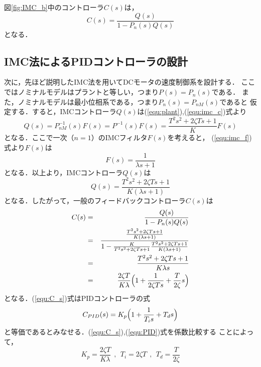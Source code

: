 \documentclass[a4paper,12pt]{jarticle}
\begin{document}
%
図\ref{fig:IMC_b}中のコントローラ$C(s)$は，
%
\begin{equation}
 C(s) = \frac{Q(s)}{1 - P_n(s)Q(s)}
\end{equation}
%
となる．
\subsection{IMC法によるPIDコントローラの設計}
次に，先ほど説明したIMC法を用いてDCモータの速度制御系を設計する．
ここではノミナルモデルはプラントと等しい，つまり$P(s)=P_{n}(s)$である．
また，ノミナルモデルは最小位相系である，つまり$P_n(s)=P_{nM}(s)$であると
仮定する．すると，IMCコントローラ$Q(s)$は(\ref{equ:plant}),(\ref{equ:imc_c})式より
%
\begin{equation}
 Q(s) = P_{nM}^{-1}(s)F(s) = P^{-1}(s)F(s) = \frac{T^2s^2+2\zeta Ts+1}{K}F(s) 
\end{equation}
%
となる．ここで一次（$n=1$）のIMCフィルタ$F(s)$を考えると，
(\ref{equ:imc_f})式より$F(s)$は
%
\begin{equation}
 F(s) = \frac{1}{\lambda s + 1}
\end{equation}
%
となる．以上より，IMCコントローラ$Q(s)$は
%
\begin{equation}
 Q(s) = \frac{T^2s^2+2\zeta Ts+1}{K(\lambda s + 1)}
\end{equation}
%
となる．したがって，一般のフィードバックコントローラ$C(s)$は
%
\begin{eqnarray}\label{equ:C_s}
 C(s) & = & \frac{Q(s)}{1 - P_n(s)Q(s)} \nonumber  \\ 
  & = & \frac{\frac{T^2s^2+2\zeta Ts+1}{K(\lambda s +
  1)}}{1-\frac{K}{T^2s^2+2\zeta Ts+1}\frac{T^2s^2+2\zeta Ts+1}{K(\lambda
  s + 1)}} \nonumber \\ 
 & = & \frac{T^2s^2+2\zeta Ts+1}{K\lambda s} \nonumber  \\
  & = & \frac{2\zeta T}{K\lambda}\Bigl(1+\frac{1}{2\zeta Ts}+\frac{T}{2\zeta}s\Bigr)
\end{eqnarray}
%
となる．(\ref{equ:C_s})式はPIDコントローラの式
%
\begin{equation}\label{equ:PID}
 C_{PID} (s) = K_p \Bigl(1+\frac{1}{T_i s} + T_d s\Bigr)
\end{equation}
%
と等価であるとみなせる．(\ref{equ:C_s}),(\ref{equ:PID})式を係数比較する
ことによって，
%
\begin{equation}\label{equ:gain}
 K_p =  \frac{2\zeta T}{K\lambda}  \ \  ,  \ \ T_i = 2\zeta T  \ \  , \ \ T_d = \frac{T}{2\zeta}
\end{equation}
\end{document}
